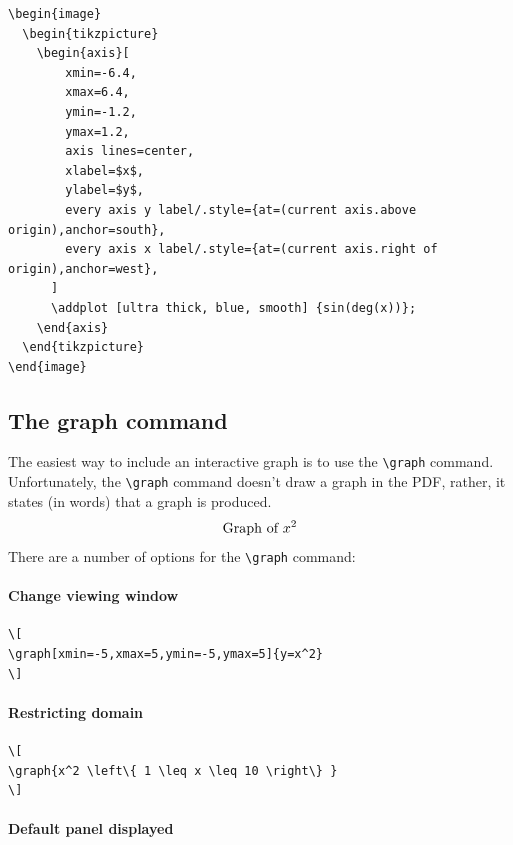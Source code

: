 \documentclass{ximera}
\begin{document}
\begin{verbatim}
\begin{image}
  \begin{tikzpicture}
    \begin{axis}[
        xmin=-6.4,
        xmax=6.4,
        ymin=-1.2,
        ymax=1.2,
        axis lines=center,
        xlabel=$x$,
        ylabel=$y$,
        every axis y label/.style={at=(current axis.above origin),anchor=south},
        every axis x label/.style={at=(current axis.right of origin),anchor=west},
      ]
      \addplot [ultra thick, blue, smooth] {sin(deg(x))};
    \end{axis}
  \end{tikzpicture}
\end{image}
\end{verbatim}











\subsection{The graph command}

The easiest way to include an interactive graph is to use the
\verb|\graph| command. Unfortunately, the \verb|\graph| command
doesn't draw a graph in the PDF, rather, it states (in words) that a
graph is produced.
\[
\text{Graph of $x^2$}
\]
There are a number of options for the \verb|\graph| command:


\paragraph{Change viewing window}

  
\begin{verbatim}
\[
\graph[xmin=-5,xmax=5,ymin=-5,ymax=5]{y=x^2}
\]
\end{verbatim}
\paragraph{Restricting domain}


\begin{verbatim}
\[
\graph{x^2 \left\{ 1 \leq x \leq 10 \right\} }
\]
\end{verbatim}
\paragraph{Default panel displayed}
\end{document}

